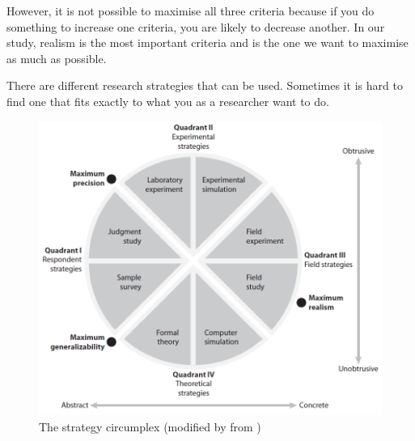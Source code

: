 However, it is not possible to maximise all three criteria because if you do something to increase one criteria, you are likely to decrease another. In our study, realism is the most important criteria and is the one we want to maximise as much as possible.

There are different research strategies that can be used. Sometimes it is hard to find one that fits exactly to what you as a researcher want to do.
\begin{figure}
\begin{center}
\includegraphics[scale=0.5]{circumplex}
\caption[The strategy circumplex]{The strategy circumplex (modified by \cite{alsos} from \cite{McGrath})}
\label{fig:circumplex}
\end{center}
\end{figure} 
